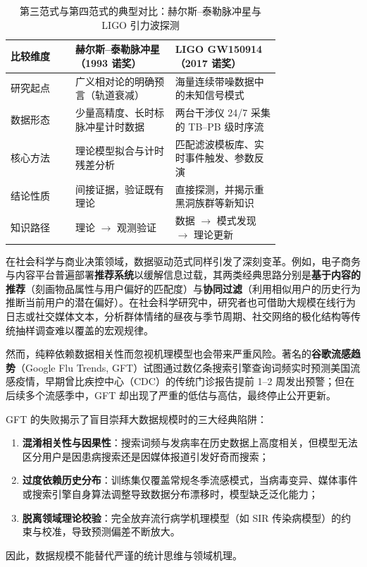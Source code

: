 \begin{table}[htbp]
  \centering\small
  \caption{第三范式与第四范式的典型对比：赫尔斯–泰勒脉冲星与 LIGO 引力波探测}\label{tab:paradigm-3-vs-4}
  \begin{tabular}{@{}l>{\raggedright\arraybackslash}p{0.37\linewidth}>{\raggedright\arraybackslash}p{0.39\linewidth}@{}}
    \toprule
    比较维度 & 赫尔斯–泰勒脉冲星（1993 诺奖） & LIGO GW150914（2017 诺奖） \\
    \midrule
    研究起点 & 广义相对论的明确预言（轨道衰减） & 海量连续带噪数据中的未知信号模式 \\
    数据形态 & 少量高精度、长时标脉冲星计时数据 & 两台干涉仪 24/7 采集的 TB–PB 级时序流 \\
    核心方法 & 理论模型拟合与计时残差分析 & 匹配滤波模板库、实时事件触发、参数反演 \\
    结论性质 & 间接证据，验证既有理论 & 直接探测，并揭示重黑洞族群等新知识 \\
    知识路径 & 理论 $\to$ 观测验证 & 数据 $\to$ 模式发现 $\to$ 理论更新 \\
    \bottomrule
  \end{tabular}
\end{table}

在社会科学与商业决策领域，数据驱动范式同样引发了深刻变革。例如，电子商务与内容平台普遍部署\textbf{推荐系统}以缓解信息过载，其两类经典思路分别是\textbf{基于内容的推荐}（刻画物品属性与用户偏好的匹配度）与\textbf{协同过滤}（利用相似用户的历史行为推断当前用户的潜在偏好）。在社会科学研究中，研究者也可借助大规模在线行为日志或社交媒体文本，分析群体情绪的昼夜与季节周期、社交网络的极化结构等传统抽样调查难以覆盖的宏观规律。

然而，纯粹依赖数据相关性而忽视机理模型也会带来严重风险。著名的\textbf{谷歌流感趋势}（Google Flu Trends, GFT）试图通过数亿条搜索引擎查询词频实时预测美国流感疫情，早期曾比疾控中心（CDC）的传统门诊报告提前 1–2 周发出预警；但在后续多个流感季中，GFT 却出现了严重的低估与高估，最终停止公开更新。

\begin{pitfall}\label{pit:big-data-hubris}
GFT 的失败揭示了盲目崇拜大数据规模时的三大经典陷阱：
\begin{enumerate}
  \item \textbf{混淆相关性与因果性}：搜索词频与发病率在历史数据上高度相关，但模型无法区分用户是因患病搜索还是因媒体报道引发好奇而搜索；
  \item \textbf{过度依赖历史分布}：训练集仅覆盖常规冬季流感模式，当病毒变异、媒体事件或搜索引擎自身算法调整导致数据分布漂移时，模型缺乏泛化能力；
  \item \textbf{脱离领域理论校验}：完全放弃流行病学机理模型（如 SIR 传染病模型）的约束与校准，导致预测偏差不断放大。
\end{enumerate}
因此，数据规模不能替代严谨的统计思维与领域机理。
\end{pitfall}

